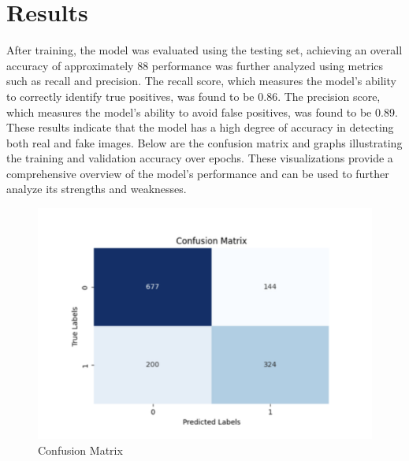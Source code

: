 \section{Results}

After training, the model was evaluated using the testing set,
achieving an overall accuracy of approximately 88%
performance was further analyzed using metrics such as recall and
precision. The recall score, which measures the model's ability to
correctly identify true positives, was found to be 0.86. The
precision score, which measures the model's ability to avoid false
positives, was found to be 0.89. These results indicate that the
model has a high degree of accuracy in detecting both real and fake
images.
Below are the confusion matrix and graphs illustrating the training
and validation accuracy over epochs. These visualizations provide a
comprehensive overview of the model's performance and can be
used to further analyze its strengths and weaknesses.

\begin{figure}[h]
    \centering
    \includegraphics[width=1\textwidth]{figures/confusion_matrix.png}
    \caption{Confusion Matrix}
    \label{fig:enter-label}
\end{figure}


